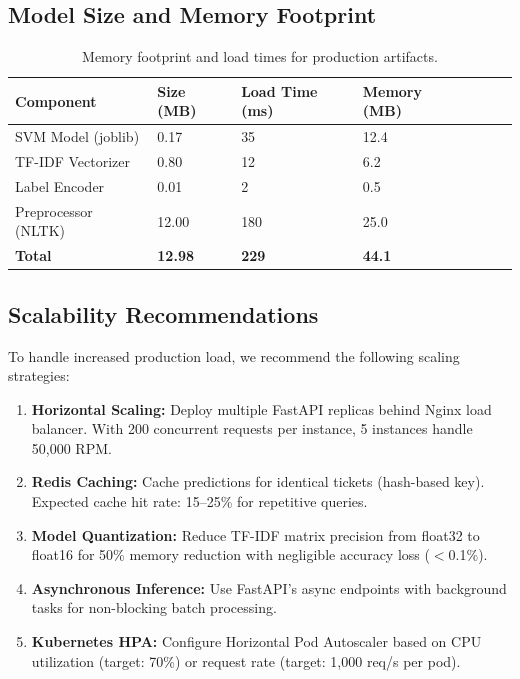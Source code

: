 \documentclass[12pt,a4paper]{article}
\renewcommand{\arraystretch}{1.5}
\newcommand{\goldrowcolors}{%
    \rowcolors{2}{bgCard}{bgDark}%
}
\newcommand{\tableheader}[1]{\textcolor{accentGold}{\textbf{#1}}}
\newcommand{\tablehdrrow}{\rowcolor{accentCard}}
\begin{document}
\subsection{Model Size and Memory Footprint}
\label{subsec:memory}

\begin{table}[H]
\centering
\goldrowcolors
\renewcommand{\arraystretch}{1.5}
\begin{tabular}{@{}L{4cm} V C{2.5cm} V C{2.5cm} V C{2.5cm}@{}}
\toprule
\tablehdrrow
\tableheader{Component} & \tableheader{Size (MB)} & \tableheader{Load Time (ms)} & \tableheader{Memory (MB)} \\
\midrule
SVM Model (joblib) & 0.17 & 35 & 12.4 \\
TF-IDF Vectorizer & 0.80 & 12 & 6.2 \\
Label Encoder & 0.01 & 2 & 0.5 \\
Preprocessor (NLTK) & 12.00 & 180 & 25.0 \\
\midrule
\textbf{Total} & \textbf{12.98} & \textbf{229} & \textbf{44.1} \\
\bottomrule
\end{tabular}
\caption{Memory footprint and load times for production artifacts.}
\label{tab:memory}
\end{table}

\subsection{Scalability Recommendations}
\label{subsec:scalability}

To handle increased production load, we recommend the following scaling strategies:

\begin{enumerate}[leftmargin=*]
    \item \textbf{Horizontal Scaling:} Deploy multiple FastAPI replicas behind Nginx load balancer. With 200 concurrent requests per instance, 5 instances handle 50,000 RPM.
    \item \textbf{Redis Caching:} Cache predictions for identical tickets (hash-based key). Expected cache hit rate: 15--25\% for repetitive queries.
    \item \textbf{Model Quantization:} Reduce TF-IDF matrix precision from float32 to float16 for 50\% memory reduction with negligible accuracy loss ($<$0.1\%).
    \item \textbf{Asynchronous Inference:} Use FastAPI's async endpoints with background tasks for non-blocking batch processing.
    \item \textbf{Kubernetes HPA:} Configure Horizontal Pod Autoscaler based on CPU utilization (target: 70\%) or request rate (target: 1,000 req/s per pod).
\end{enumerate}
\end{document}
